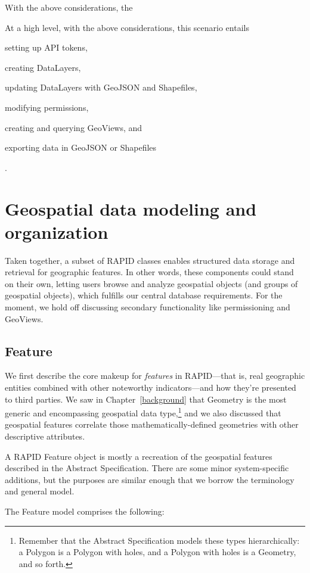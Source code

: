 With the above considerations, the 

At a high level, with the above considerations, this scenario entails
\begin{enumerate*}[label=\itshape\alph*\upshape)]
\item setting up API tokens,
\item creating DataLayers,
\item updating DataLayers with GeoJSON and Shapefiles,
\item modifying permissions,
\item creating and querying GeoViews, and
\item exporting data in GeoJSON or Shapefiles
\end{enumerate*}.

\section{Geospatial data modeling and organization}
Taken together, a subset of RAPID classes enables structured data storage and retrieval for geographic features. In other words, these components could stand on their own, letting users browse and analyze geospatial objects (and groups of geospatial objects), which fulfills our central database requirements. For the moment, we hold off discussing secondary functionality like permissioning and GeoViews.

\subsection{Feature}
We first describe the core makeup for \textit{features} in RAPID---that is, real geographic entities combined with other noteworthy indicators---and how they're presented to third parties. We saw in Chapter~\ref{background} that Geometry is the most generic and encompassing geospatial data type,\footnote{Remember that the Abstract Specification models these types hierarchically: a Polygon is a Polygon with holes, and a Polygon with holes is a Geometry, and so forth.} and we also discussed that geospatial features correlate those mathematically-defined geometries with other descriptive attributes.

A RAPID Feature object is mostly a recreation of the geospatial features described in the Abstract Specification. There are some minor system-specific additions, but the purposes are similar enough that we borrow the terminology and general model.

The Feature model comprises the following:

